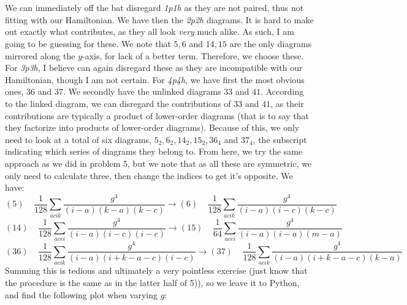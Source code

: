 \documentclass{article}
\begin{document}
\section{}
We can immediately off the bat disregard \emph{1p1h} as they are not paired, thus not fitting with our Hamiltonian.\newline
We have then the \emph{2p2h} diagrams. It is hard to make out exactly what contributes, as they all look \emph{very} much alike. As such, I am going to be guessing for these. We note that $5, 6$ and $14, 15$ are the only diagrams mirrored along the $y$-axis, for lack of a better term. Therefore, we choose these.
\newline
For \emph{3p3h}, I believe can again disregard these as they are incompatible with our Hamiltonian, though I am not certain. \newline
For \emph{4p4h}, we have first the most obvious ones, $36$ and $37$. We secondly have the unlinked diagrams $33$ and $41$. According to the linked diagram, we can disregard the contributions of $33$ and $41$, as their contributions are typically a product of lower-order diagrams (that is to say that they factorize into products of lower-order diagrams). \newline
Because of this, we only need to look at a total of six diagrams, $5_2, 6_2, 14_2, 15_2, 36_4$ and $37_4$, the subscript indicating which series of diagrams they belong to. \newline
From here, we try the same approach as we did in problem 5, but we note that as all these are symmetric, we only need to calculate three, then change the indices to get it's opposite. We have:
\begin{equation*}
    (5) \; \; \; \; \frac{1}{128} \sum_{acik} \frac{g^4}{(i-a)(k-a)(k-c)} \xrightarrow[]{} (6)\;\;\;\; \frac{1}{128} \sum_{acik} \frac{g^4}{(i-a)(i-c)(k-c)}
\end{equation*}
\begin{equation*}
    (14) \;\;\;\; \frac{1}{128} \sum_{acei} \frac{g^4}{(i-a)(i-c)(i-e)} \xrightarrow[]{} (15) \;\;\;\; \frac{1}{64} \sum_{acei} \frac{g^4}{(i-a)(i-a)(m-a)}
\end{equation*}
\begin{equation*}
    (36) \;\;\;\; \frac{1}{128} \sum_{acik} \frac{g^4}{(i-a)(i+k-a-c)(i-c)} \xrightarrow[]{} (37) \; \; \; \; \frac{1}{128} \sum_{acik} \frac{g^4}{(i-a)(i+k-a-c)(k-a)}
\end{equation*}
Summing this is tedious and ultimately a very pointless exercise (just know that the procedure is the same as in the latter half of  5)), so we leave it to Python, and find the following plot when varying $g$:
\end{document}
